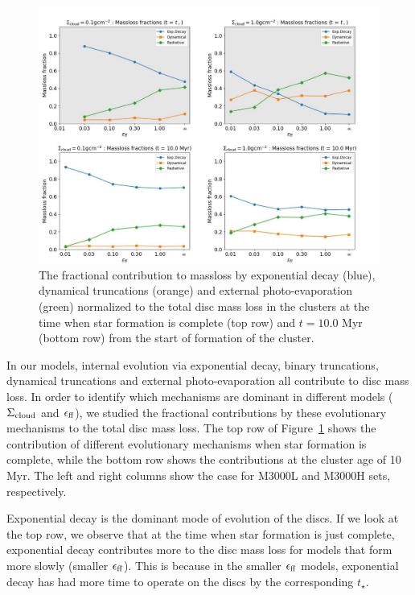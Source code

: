 \documentclass[fleqn,usenatbib]{mnras}
\begin{document}
\begin{figure}
    \centering
    \includegraphics[width=\textwidth]{figures/PanelContributionSigma_new.pdf}
    \caption{The fractional contribution to massloss by exponential decay (blue), dynamical truncations (orange) and external photo-evaporation (green) normalized to the total disc mass loss in the clusters at the time when star formation is complete (top row) and $t = 10.0$ Myr (bottom row) from the start of formation of the cluster.}
    \label{fig:fractionsstarformation}
\end{figure}

In our models, internal evolution via exponential decay, binary truncations, dynamical truncations and external photo-evaporation all contribute to disc mass loss. In order to identify which mechanisms are dominant in different models ($\Sigma_{\rm cloud}$ and $\epsilon_{\rm ff}$), we studied the fractional contributions by these evolutionary mechanisms to the total disc mass loss. The top row of Figure~\ref{fig:fractionsstarformation} shows the contribution of different evolutionary mechanisms when star formation is complete, while the bottom row shows the contributions at the cluster age of 10 Myr. The left and right columns show the case for M3000L and M3000H sets, respectively. 

Exponential decay is the dominant mode of evolution of the discs. If we look at the top row, we observe that at the time when star formation is just complete, exponential decay contributes more to the disc mass loss for models that form more slowly (smaller $\epsilon_{\rm ff}$). This is because in the smaller $\epsilon_{\rm ff}$ models, exponential decay has had more time to operate on the discs by the corresponding $t_\star$.
\end{document}
